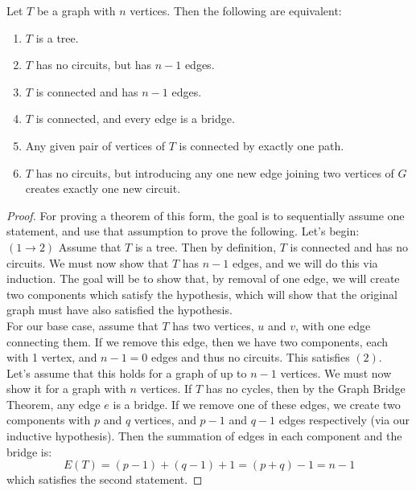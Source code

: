 \begin{theorem}
	Let $T$ be a graph with $n$ vertices. Then the following are equivalent:
	\begin{enumerate}
		\item $T$ is a tree.
		\item $T$ has no circuits, but has $n-1$ edges.
		\item $T$ is connected and has $n-1$ edges.
		\item $T$ is connected, and every edge is a bridge.
		\item Any given pair of vertices of $T$ is connected by exactly one path.
		\item $T$ has no circuits, but introducing any one new edge joining two vertices of $G$ creates exactly one new circuit.
	\end{enumerate}
\end{theorem}
\begin{proof}
	For proving a theorem of this form, the goal is to sequentially assume one statement, and use that assumption to prove the following. Let's begin: \\
	$(1 \rightarrow 2)$ Assume that $T$ is a tree. Then by definition, $T$ is connected and has no circuits. We must now show that $T$ has $n-1$ edges, and we will do this via induction. The goal will be to show that, by removal of one edge, we will create two components which satisfy the hypothesis, which will show that the original graph must have also satisfied the hypothesis. \\
	For our base case, assume that $T$ has two vertices, $u$ and $v$, with one edge connecting them. If we remove this edge, then we have two components, each with 1 vertex, and $n-1=0$ edges and thus no circuits. This satisfies $(2)$. \\
	Let's assume that this holds for a graph of up to $n-1$ vertices. We must now show it for a graph with $n$ vertices. If $T$ has no cycles, then by the Graph Bridge Theorem, any edge $e$ is a bridge. If we remove one of these edges, we create two components with $p$ and $q$ vertices, and $p-1$ and $q-1$ edges respectively (via our inductive hypothesis). Then the summation of edges in each component and the bridge is:
	\begin{equation*}
		E(T) = (p-1)+(q-1)+1 = (p+q)-1 = n-1
	\end{equation*}
	which satisfies the second statement.
\end{proof}